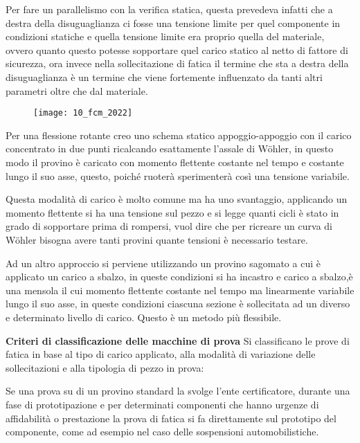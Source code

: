 \documentclass{article}
\begin{document}
\begin{adjustwidth}{2in}{}
		  Per fare un parallelismo con la verifica statica, questa prevedeva infatti che a destra della disuguaglianza ci fosse una tensione limite per quel componente in condizioni statiche e quella tensione limite era proprio quella del materiale, ovvero quanto questo potesse sopportare quel carico statico al netto di fattore di sicurezza, ora invece nella sollecitazione di fatica il termine che sta a destra della disuguaglianza è un termine che viene fortemente influenzato da tanti altri parametri oltre che dal materiale. 
		  
		\end{adjustwidth}
		\begin{figure}[H]
		\texttt{[image: 10\_fcm\_2022]}
		\end{figure}
		\begin{adjustwidth}{2in}{}
		  
		  Per una flessione rotante creo uno schema statico appoggio-appoggio con il carico concentrato in due punti ricalcando esattamente l'assale di Wöhler, in questo modo il provino è caricato con momento flettente costante nel tempo e costante lungo il suo asse, questo, poiché ruoterà sperimenterà così una tensione variabile.
		  
		  Questa modalità di carico è molto comune ma ha uno svantaggio, applicando un momento flettente si ha una tensione sul pezzo e si legge quanti cicli è stato in grado di sopportare prima di rompersi, vuol dire che per ricreare un curva di Wöhler bisogna avere tanti provini quante tensioni è necessario testare. \newline 
		  
		  Ad un altro approccio si perviene utilizzando un provino sagomato a cui è applicato un carico a sbalzo, in queste condizioni si ha incastro e carico a sbalzo,è una mensola il cui momento flettente costante nel tempo ma linearmente variabile lungo il suo asse, in queste condizioni ciascuna sezione è sollecitata ad un diverso e determinato livello di carico. Questo è un metodo più flessibile. \newline
		  
		  \textbf{Criteri di classificazione delle macchine di prova} \newline
		  Si classificano le prove di fatica in base al tipo di carico applicato, alla modalità di variazione delle sollecitazioni e alla tipologia di pezzo in prova:
		  
		  Se una prova su di un provino standard la svolge l'ente certificatore, durante una fase di prototipazione e per determinati componenti che hanno urgenze di affidabilità o prestazione la prova di fatica si fa direttamente sul prototipo del componente, come ad esempio nel caso delle sospensioni automobilistiche.
		  

\end{adjustwidth}
\end{document}
